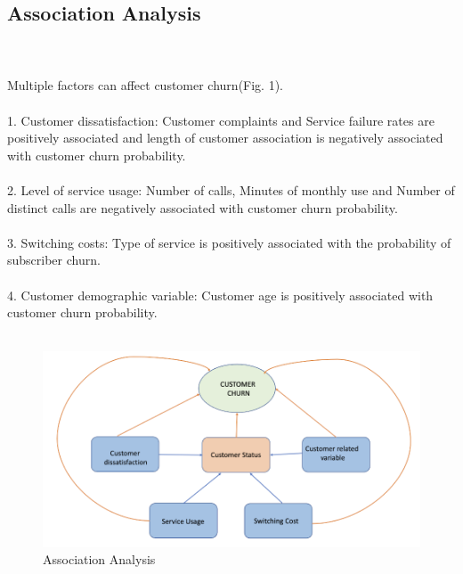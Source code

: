 \documentclass[a4paper, 10pt, conference]{ieeeconf}      %
\begin{document}
\subsection{\textbf{Association Analysis}}
\\\
\\Multiple factors can affect customer churn(Fig. 1).
\\\
\\1. {Customer dissatisfaction}: 
Customer complaints and Service failure rates are positively associated and length of customer association is negatively associated with customer churn probability. 
\\\
\\2. {Level of service usage}: 
Number of calls, Minutes of monthly use and Number of distinct calls are negatively associated with customer churn probability. 
\\\
\\3. {Switching costs}: 
Type of service is positively associated with the probability of subscriber churn.
\\\
\\4. {Customer demographic variable}: 
Customer age is positively associated with customer churn probability.
\\\
\begin{figure}[htp]
    \centering
    \includegraphics[scale= .55]{Images/AssociationAnalysis.png}
    \caption{Association Analysis}
    \label{fig:AssociationAnalysis}
\end{figure}
\\
\end{document}
